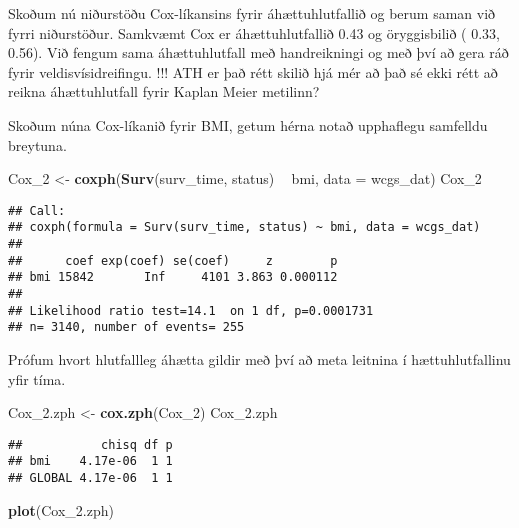 \documentclass[
]{book}
\newenvironment{Shaded}{\begin{snugshade}}{\end{snugshade}}
\newcommand{\DataTypeTok}[1]{\textcolor[rgb]{0.13,0.29,0.53}{#1}}
\newcommand{\DecValTok}[1]{\textcolor[rgb]{0.00,0.00,0.81}{#1}}
\newcommand{\FloatTok}[1]{\textcolor[rgb]{0.00,0.00,0.81}{#1}}
\newcommand{\KeywordTok}[1]{\textcolor[rgb]{0.13,0.29,0.53}{\textbf{#1}}}
\newcommand{\NormalTok}[1]{#1}
\newcommand{\OperatorTok}[1]{\textcolor[rgb]{0.81,0.36,0.00}{\textbf{#1}}}
\newcommand{\StringTok}[1]{\textcolor[rgb]{0.31,0.60,0.02}{#1}}
\begin{document}
Skoðum nú niðurstöðu Cox-líkansins fyrir áhættuhlutfallið og berum saman við fyrri niðurstöður. Samkvæmt Cox er áhættuhlutfallið 0.43 og öryggisbilið ( 0.33, 0.56). Við fengum sama áhættuhlutfall með handreikningi og með því að gera ráð fyrir veldisvísidreifingu. !!! ATH er það rétt skilið hjá mér að það sé ekki rétt að reikna áhættuhlutfall fyrir Kaplan Meier metilinn?

Skoðum núna Cox-líkanið fyrir BMI, getum hérna notað upphaflegu samfelldu breytuna.

\begin{Shaded}
\begin{Highlighting}[]
\NormalTok{Cox_}\DecValTok{2}\NormalTok{ <-}\StringTok{ }\KeywordTok{coxph}\NormalTok{(}\KeywordTok{Surv}\NormalTok{(surv_time, status) }\OperatorTok{~}\StringTok{ }\NormalTok{bmi, }\DataTypeTok{data =}\NormalTok{ wcgs_dat)}
\NormalTok{Cox_}\DecValTok{2}
\end{Highlighting}
\end{Shaded}

\begin{verbatim}
## Call:
## coxph(formula = Surv(surv_time, status) ~ bmi, data = wcgs_dat)
## 
##      coef exp(coef) se(coef)     z        p
## bmi 15842       Inf     4101 3.863 0.000112
## 
## Likelihood ratio test=14.1  on 1 df, p=0.0001731
## n= 3140, number of events= 255
\end{verbatim}

Prófum hvort hlutfallleg áhætta gildir með því að meta leitnina í hættuhlutfallinu yfir tíma.

\begin{Shaded}
\begin{Highlighting}[]
\NormalTok{Cox_}\FloatTok{2.}\NormalTok{zph <-}\StringTok{ }\KeywordTok{cox.zph}\NormalTok{(Cox_}\DecValTok{2}\NormalTok{)}
\NormalTok{Cox_}\FloatTok{2.}\NormalTok{zph}
\end{Highlighting}
\end{Shaded}

\begin{verbatim}
##           chisq df p
## bmi    4.17e-06  1 1
## GLOBAL 4.17e-06  1 1
\end{verbatim}

\begin{Shaded}
\begin{Highlighting}[]
\KeywordTok{plot}\NormalTok{(Cox_}\FloatTok{2.}\NormalTok{zph)}
\end{Highlighting}
\end{Shaded}
\end{document}
